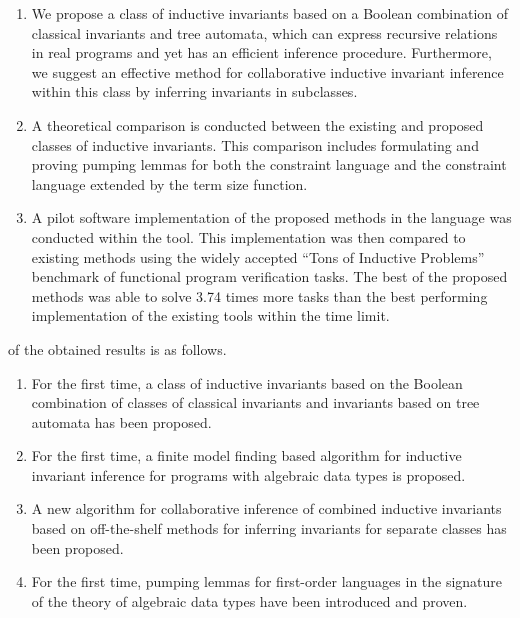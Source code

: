 \begin{enumerate}[beginpenalty=10000]
  \item We propose a class of inductive invariants based on a Boolean combination of classical invariants and tree automata, which can express recursive relations in real programs and yet has an efficient inference procedure. Furthermore, we suggest an effective method for collaborative inductive invariant inference within this class by inferring invariants in subclasses.
  \item A theoretical comparison is conducted between the existing and proposed classes of inductive invariants. This comparison includes formulating and proving pumping lemmas for both the constraint language and the constraint language extended by the term size function.
  \item A pilot software implementation of the proposed methods in the \fsharp{} language was conducted within the \ringen{} tool. This implementation was then compared to existing methods using the widely accepted ``Tons of Inductive Problems'' benchmark of functional program verification tasks. The best of the proposed methods was able to solve 3.74 times more tasks than the best performing implementation of the existing tools within the time limit.
\end{enumerate}

{\novelty{} of the obtained results is as follows.}
\begin{enumerate}[beginpenalty=10000] %
  \item For the first time, a class of inductive invariants based on the Boolean combination of classes of classical invariants and invariants based on tree automata has been proposed.
  \item For the first time, a finite model finding based algorithm for inductive invariant inference for programs with algebraic data types is proposed.
  \item A new algorithm for collaborative inference of combined inductive invariants based on off-the-shelf methods for inferring invariants for separate classes has been proposed.
   \item For the first time, pumping lemmas for first-order languages in the signature of the theory of algebraic data types have been introduced and proven.
\end{enumerate}

